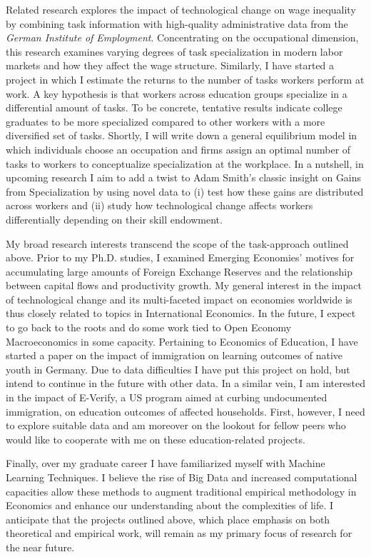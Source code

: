 \documentclass[a4paper,11pt]{article}
\begin{document}
Related research explores the impact of technological change on wage inequality by combining task information with high-quality administrative data from the \textit{German Institute of Employment}. Concentrating on the occupational dimension, this research examines varying degrees of task specialization in modern labor markets and how they affect the wage structure. Similarly, I have started a project in which I estimate the returns to the number of tasks workers perform at work. A key hypothesis is that workers across education groups specialize in a differential amount of tasks. To be concrete, tentative results indicate college graduates to be more specialized compared to other workers with a more diversified set of tasks. Shortly, I will write down a general equilibrium model in which individuals choose an occupation and firms assign an optimal number of tasks to workers to conceptualize specialization at the workplace. In a nutshell, in upcoming research I aim to add a twist to Adam Smith's classic insight on Gains from Specialization by using novel data to (i) test how these gains are distributed across workers and (ii) study how technological change affects workers differentially depending on their skill endowment. 

My broad research interests transcend the scope of the task-approach outlined above. Prior to my Ph.D. studies, I examined Emerging Economies' motives for accumulating large amounts of Foreign Exchange Reserves and the relationship between capital flows and productivity growth. My general interest in the impact of technological change and its multi-faceted impact on economies worldwide is thus closely related to topics in International Economics. In the future, I expect to go back to the roots and do some work tied to Open Economy Macroeconomics in some capacity. Pertaining to Economics of Education, I have started a paper on the impact of immigration on learning outcomes of native youth in Germany. Due to data difficulties I have put this project on hold, but intend to continue in the future with other data. In a similar vein, I am interested in the impact of E-Verify, a US program aimed at curbing undocumented immigration, on education outcomes of affected households. First, however, I need to explore suitable data and am moreover on the lookout for fellow peers who would like to cooperate with me on these education-related projects. 

Finally, over my graduate career I have familiarized myself with Machine Learning Techniques. I believe the rise of Big Data and increased computational capacities allow these methods to augment traditional empirical methodology in Economics and enhance our understanding about the complexities of life. I anticipate that the projects outlined above, which place emphasis on both theoretical and empirical work, will remain as my primary focus of research for the near future. 
\end{document}
